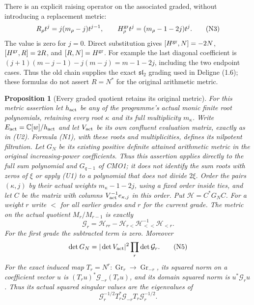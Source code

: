 \documentclass[11pt]{article}
\newtheorem{proposition}[theorem]{Proposition}
\begin{document}
There is an explicit raising operator on the associated graded, without
introducing a replacement metric:
\[
 R_\rho t^j=j(m_\rho-j)t^{j-1},\qquad
 H_\rho^{\rm gr}t^j=(m_\rho-1-2j)t^j.
 \tag{N3}
\]
The value is zero for $j=0$. Direct substitution gives
$[H^{\rm gr},N]=-2N$, $[H^{\rm gr},R]=2R$, and
$[R,N]=H^{\rm gr}$. For example the last diagonal coefficient is
$(j+1)(m-j-1)-j(m-j)=m-1-2j$, including the two endpoint cases.
Thus the old chain supplies the exact $\mathfrak{sl}_2$ grading used
in Deligne (1.6); these formulas do not assert $R=N^*$ for the original
arithmetic metric.

\begin{proposition}[Every graded quotient retains its original metric]
For this metric assertion let $h_{\rm act}$ be any of the programme's
actual monic finite root polynomials, retaining every root $\kappa$
and its full multiplicity $m_\kappa$. Write
$E_{\rm act}=\mathbb C[w]/h_{\rm act}$ and let $V_{\rm act}$ be its own
confluent evaluation matrix, exactly as in (U2). Formula (N1), with
these roots and multiplicities, defines its nilpotent filtration.
Let $G_N$ be its existing positive definite attained arithmetic metric
in the original increasing-power coefficients. Thus this assertion
applies directly to the full sum polynomial and $G_{q-1}$ of CMO1;
it does not identify the sum roots with zeros of $\xi$ or apply (U1)
to a polynomial that does not divide $2\xi$.
Order the pairs $(\kappa,j)$ by their actual weights
$m_\kappa-1-2j$, using a fixed order inside ties, and let $C$ be
the matrix with columns $V_{\rm act}^{-1}e_{\kappa,j}$ in this order.
Put $\mathcal H=C^*G_NC$. For a weight $r$ write $<$ for all earlier
grades and $r$ for the current grade. The metric on the actual quotient
$M_r/M_{r-1}$ is exactly
\[
 \mathcal G_r=\mathcal H_{rr}
      -\mathcal H_{r<}\mathcal H_{<<}^{-1}\mathcal H_{<r}.
 \tag{N4}
\]
For the first grade the subtracted term is zero. Moreover
\[
 \det G_N=|\det V_{\rm act}|^2\prod_r\det\mathcal G_r.
 \tag{N5}
\]
For the exact induced map $T_r=N^r:\operatorname{Gr}_r\to
\operatorname{Gr}_{-r}$, its squared norm on a coefficient vector $u$
is $(T_ru)^*\mathcal G_{-r}(T_ru)$, and its domain squared norm is
$u^*\mathcal G_ru$. Thus its actual squared singular values are the
eigenvalues of
\[
 \mathcal G_r^{-1/2}T_r^*\mathcal G_{-r}T_r
                  \mathcal G_r^{-1/2}.
 \tag{N6}
\]
\end{proposition}
\end{document}

